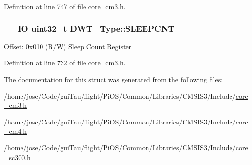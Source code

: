 Definition at line 747 of file core\-\_\-cm3.\-h.

\hypertarget{struct_d_w_t___type_a8afd5a4bf994011748bc012fa442c74d}{
\subsubsection[{S\-L\-E\-E\-P\-C\-N\-T}]{\setlength{\rightskip}{0pt plus 5cm}\-\_\-\-\_\-\-I\-O {\bf uint32\-\_\-t} D\-W\-T\-\_\-\-Type\-::\-S\-L\-E\-E\-P\-C\-N\-T}}\label{struct_d_w_t___type_a8afd5a4bf994011748bc012fa442c74d}
Offset\-: 0x010 (R/\-W) Sleep Count Register 

Definition at line 732 of file core\-\_\-cm3.\-h.



The documentation for this struct was generated from the following files\-:\begin{DoxyCompactItemize}
\item 
/home/jose/\-Code/gui\-Tau/flight/\-Pi\-O\-S/\-Common/\-Libraries/\-C\-M\-S\-I\-S3/\-Include/\hyperlink{_common_2_libraries_2_c_m_s_i_s3_2_include_2core__cm3_8h}{core\-\_\-cm3.\-h}\item 
/home/jose/\-Code/gui\-Tau/flight/\-Pi\-O\-S/\-Common/\-Libraries/\-C\-M\-S\-I\-S3/\-Include/\hyperlink{core__cm4_8h}{core\-\_\-cm4.\-h}\item 
/home/jose/\-Code/gui\-Tau/flight/\-Pi\-O\-S/\-Common/\-Libraries/\-C\-M\-S\-I\-S3/\-Include/\hyperlink{core__sc300_8h}{core\-\_\-sc300.\-h}\end{DoxyCompactItemize}
